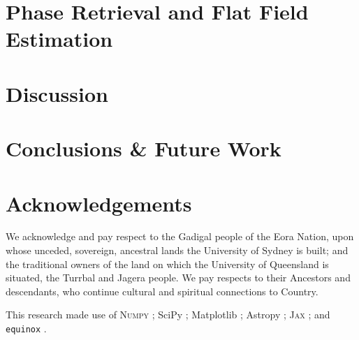 \documentclass[]{spie}
\begin{document}


\section{Phase Retrieval and Flat Field Estimation}
\label{sec:phaseretrieval}





\section{Discussion}

\section{Conclusions \& Future Work}




\section{Acknowledgements}

We acknowledge and pay respect to the Gadigal people of the Eora Nation, upon whose unceded, sovereign, ancestral lands the University of Sydney is built; and the traditional owners of the land on which the University of Queensland is situated, the Turrbal and Jagera people. We pay respects to their Ancestors and descendants, who continue cultural and spiritual connections to Country. 

This research made use of \textsc{Numpy} \cite{numpy}; SciPy \cite{scipy}; Matplotlib \cite{matplotlib}; Astropy \cite{astropy:2013,astropy:2018}; \textsc{Jax} \cite{jax}; and \texttt{equinox} \cite{kidger2021equinox}.


\end{document}
